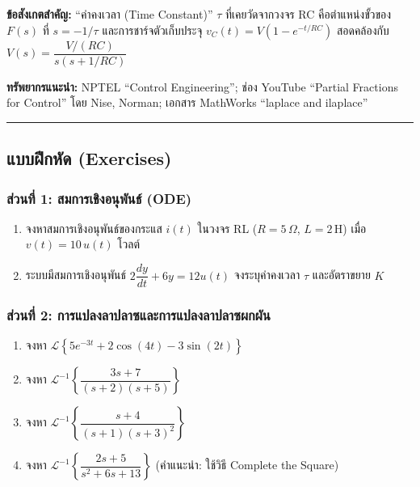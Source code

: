 \textbf{ข้อสังเกตสำคัญ:} ``ค่าคงเวลา (Time Constant)'' \(\tau\)
ที่เคยวัดจากวงจร RC คือตำแหน่งขั้วของ \(F(s)\) ที่ \(s = -1/\tau\)
และการชาร์จตัวเก็บประจุ \(v_C(t) = V(1-e^{-t/RC})\) สอดคล้องกับ
\(V(s) = \dfrac{V/(RC)}{s(s+1/RC)}\)

\textbf{ทรัพยากรแนะนำ:} NPTEL ``Control Engineering''; ช่อง YouTube
``Partial Fractions for Control'' โดย Nise, Norman; เอกสาร MathWorks
``laplace and ilaplace''

\begin{center}\rule{0.5\linewidth}{0.5pt}\end{center}

\newpage

\subsection{แบบฝึกหัด
(Exercises)}\label{uxe41uxe1auxe1auxe1duxe01uxe2buxe14-exercises}

\subsubsection{ส่วนที่ 1: สมการเชิงอนุพันธ์
(ODE)}\label{uxe2auxe27uxe19uxe17-1-uxe2auxe21uxe01uxe32uxe23uxe40uxe0auxe07uxe2duxe19uxe1euxe19uxe18-ode}

\begin{enumerate}
\def\labelenumi{\arabic{enumi}.}
\tightlist
\item
  จงหาสมการเชิงอนุพันธ์ของกระแส \(i(t)\) ในวงจร RL (\(R=5\,\Omega\),
  \(L=2\,\text{H}\)) เมื่อ \(v(t) = 10\,u(t)\) โวลต์
\item
  ระบบมีสมการเชิงอนุพันธ์ \(2\dfrac{dy}{dt} + 6y = 12u(t)\) จงระบุค่าคงเวลา
  \(\tau\) และอัตราขยาย \(K\)
\end{enumerate}

\subsubsection{ส่วนที่ 2:
การแปลงลาปลาซและการแปลงลาปลาซผกผัน}\label{uxe2auxe27uxe19uxe17-2-uxe01uxe32uxe23uxe41uxe1buxe25uxe07uxe25uxe32uxe1buxe25uxe32uxe0buxe41uxe25uxe30uxe01uxe32uxe23uxe41uxe1buxe25uxe07uxe25uxe32uxe1buxe25uxe32uxe0buxe1cuxe01uxe1cuxe19}

\begin{enumerate}
\def\labelenumi{\arabic{enumi}.}
\setcounter{enumi}{2}
\tightlist
\item
  จงหา
  \(\mathcal{L}\!\left\{5e^{-3t} + 2\cos(4t) - 3\sin(2t)\right\}\)
\item
  จงหา \(\mathcal{L}^{-1}\!\left\{\dfrac{3s+7}{(s+2)(s+5)}\right\}\)
\item
  จงหา \(\mathcal{L}^{-1}\!\left\{\dfrac{s+4}{(s+1)(s+3)^2}\right\}\)
\item
  จงหา \(\mathcal{L}^{-1}\!\left\{\dfrac{2s+5}{s^2+6s+13}\right\}\)
  (คำแนะนำ: ใช้วิธี Complete the Square)
\end{enumerate}

